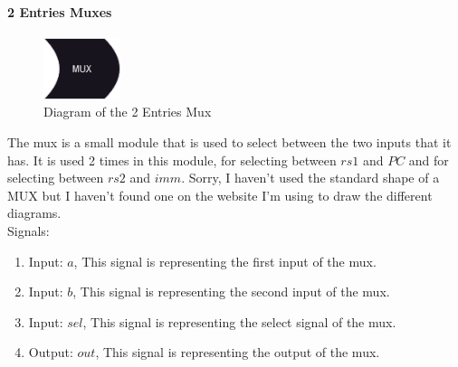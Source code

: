 \paragraph{2 Entries Muxes}

\begin{figure}[H]
    \centering
    \includegraphics[width=0.20\textwidth]{design/pipelined/decode/images/mux2.png}
    \caption{Diagram of the 2 Entries Mux}
    \label{fig:mux2}
\end{figure}

The mux is a small module that is used to select between the two inputs that it has. It is used 2 times in this module, for selecting between
$rs1$ and $PC$ and for selecting between $rs2$ and $imm$. Sorry, I haven't used the standard shape of a MUX but I haven't found one on the 
website I'm using to draw the different diagrams. \\

Signals:
\begin{enumerate}[label={\textbullet}]
    \item Input: $a$, This signal is representing the first input of the mux.
    \item Input: $b$, This signal is representing the second input of the mux.
    \item Input: $sel$, This signal is representing the select signal of the mux.
    \item Output: $out$, This signal is representing the output of the mux.
\end{enumerate}